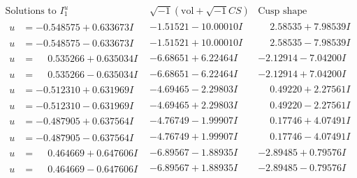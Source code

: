 \documentclass[1p]{elsarticle_modified}
\theoremstyle{definition}
\newcommand{\I}{\sqrt{-1}}
\begin{document}
$$\begin{array}{c|c|c}  
\text{Solutions to }I^u_{1}& \I (\text{vol} + \sqrt{-1}CS) & \text{Cusp shape}\\
 \hline 
\begin{aligned}
u &= -0.548575 + 0.633673 I\end{aligned}
 & -1.51521 - 10.00010 I & \phantom{-}2.58535 + 7.98539 I \\ \hline\begin{aligned}
u &= -0.548575 - 0.633673 I\end{aligned}
 & -1.51521 + 10.00010 I & \phantom{-}2.58535 - 7.98539 I \\ \hline\begin{aligned}
u &= \phantom{-}0.535266 + 0.635034 I\end{aligned}
 & -6.68651 + 6.22464 I & -2.12914 - 7.04200 I \\ \hline\begin{aligned}
u &= \phantom{-}0.535266 - 0.635034 I\end{aligned}
 & -6.68651 - 6.22464 I & -2.12914 + 7.04200 I \\ \hline\begin{aligned}
u &= -0.512310 + 0.631969 I\end{aligned}
 & -4.69465 - 2.29803 I & \phantom{-}0.49220 + 2.27561 I \\ \hline\begin{aligned}
u &= -0.512310 - 0.631969 I\end{aligned}
 & -4.69465 + 2.29803 I & \phantom{-}0.49220 - 2.27561 I \\ \hline\begin{aligned}
u &= -0.487905 + 0.637564 I\end{aligned}
 & -4.76749 - 1.99907 I & \phantom{-}0.17746 + 4.07491 I \\ \hline\begin{aligned}
u &= -0.487905 - 0.637564 I\end{aligned}
 & -4.76749 + 1.99907 I & \phantom{-}0.17746 - 4.07491 I \\ \hline\begin{aligned}
u &= \phantom{-}0.464669 + 0.647606 I\end{aligned}
 & -6.89567 - 1.88935 I & -2.89485 + 0.79576 I \\ \hline\begin{aligned}
u &= \phantom{-}0.464669 - 0.647606 I\end{aligned}
 & -6.89567 + 1.88935 I & -2.89485 - 0.79576 I \\ \hline\begin{aligned}

\end{aligned}
\end{array}$$
\end{document}
